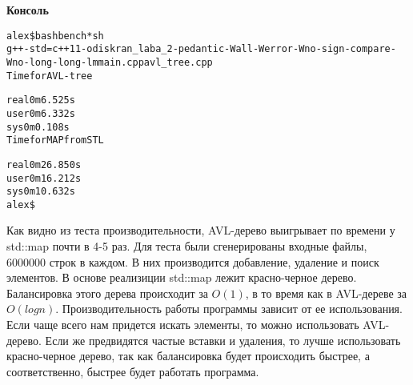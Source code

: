 \textbf{Консоль}
\begin{alltt}
alex\$ bash bench*sh
g++ -std=c++11 -o diskran_laba_2 -pedantic -Wall -Werror -Wno-sign-compare -Wno-long-long -lm main.cpp avl_tree.cpp
Time for AVL-tree

real    0m6.525s
user    0m6.332s
sys     0m0.108s
Time for MAP from STL

real    0m26.850s
user    0m16.212s
sys     0m10.632s
alex\$
\end{alltt}
Как видно из теста производительности, AVL-дерево выигрывает по времени у std::map почти в 4-5 раз. Для теста были сгенерированы входные файлы, 6000000 строк в каждом. В них производится добавление, удаление и поиск элементов. 
В основе реализиции std::map лежит красно-черное дерево. Балансировка этого дерева происходит за $O(1)$, в то время как в AVL-дереве за $O(logn)$. Производительность работы программы зависит от ее использования. Если чаще всего нам придется искать элементы, то можно использовать AVL-дерево. Если же предвидятся частые вставки и удаления, то лучше использовать красно-черное дерево, так как балансировка будет происходить быстрее, а соответственно, быстрее будет работать программа.
\pagebreak
